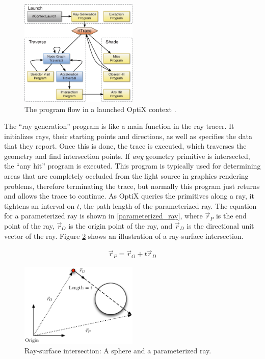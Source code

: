 \begin{figure}[h!] 
  \centering
    \includegraphics[width=0.5\textwidth]{graphics/optix_flow.eps}
     \caption{The program flow in a launched OptiX context \cite{optix_paper}. \label{optix_flow}}
\end{figure}

The ``ray generation'' program is like a main function in the ray tracer. It initializes rays, their starting points and directions, as well as specifies the data that they report.  Once this is done, the trace is executed, which traverses the geometry and find intersection points.  If \emph{any} geometry primitive is intersected, the ``any hit'' program is executed.  This program is typically used for determining areas that are completely occluded from the light source in graphics rendering problems, therefore terminating the trace, but normally this program just returns and allows the trace to continue.  As OptiX queries the primitives along a ray, it tightens an interval on $t$, the path length of the parameterized ray.  The equation for a parameterized ray is shown in \eqref{parameterized_ray}, where $\vec{r}_P$ is the end point of the ray, $\vec{r}_O$ is the origin point of the ray, and $\vec{r}_D$ is the directional unit vector of the ray.  Figure \ref{ray_surface} shows an illustration of a ray-surface intersection.

\begin{equation}
\label{parameterized_ray}
\begin{split}
\vec{r}_P = \vec{r}_O + t \vec{r}_D 
\end{split}
\end{equation}

\begin{figure}[h!] 
  \centering
    \includegraphics[width=0.5\textwidth]{graphics/ray_surface.eps}
     \caption{Ray-surface intersection:  A sphere and a parameterized ray. \label{ray_surface}}
\end{figure}

